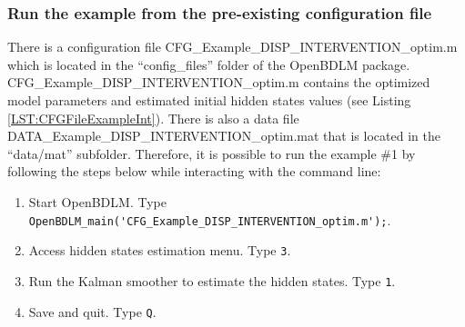 \subsubsection{Run the example from the pre-existing configuration file}
\label{SS:LoadConfigFileEx1}
There is a configuration file CFG\_Example\_DISP\_INTERVENTION\_optim.m which is located in the ``config\_files'' folder of the OpenBDLM package.
CFG\_Example\_DISP\_INTERVENTION\_optim.m contains the optimized model parameters and estimated initial hidden states values (see Listing \ref{LST:CFGFileExampleInt}).
There is also a data file DATA\_Example\_DISP\_INTERVENTION\_optim.mat that is located in the ``data/mat'' subfolder.
Therefore, it is possible to run the example \#1 by following the steps below while interacting with the \MATLAB{} command line:
\begin{enumerate}
\item Start OpenBDLM. Type \colorbox{light-gray}{\lstinline[basicstyle = \mlttfamily \small, backgroundcolor = \color{light-gray}]!OpenBDLM_main('CFG_Example_DISP_INTERVENTION_optim.m');!}.
\item Access hidden states estimation menu. Type \colorbox{light-gray}{\lstinline[basicstyle = \mlttfamily \small, backgroundcolor = \color{light-gray}]!3!}.
\item Run the Kalman smoother to estimate the hidden states. Type \colorbox{light-gray}{\lstinline[basicstyle = \mlttfamily \small, backgroundcolor = \color{light-gray}]!1!}.
\item Save and quit. Type \colorbox{light-gray}{\lstinline[basicstyle = \mlttfamily \small, backgroundcolor = \color{light-gray}]!Q!}.
\end{enumerate}



